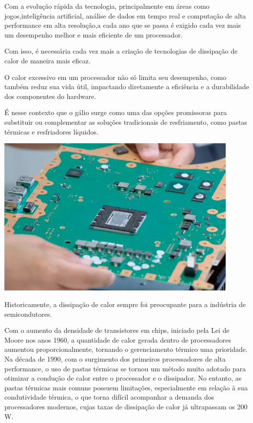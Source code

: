 \documentclass[12pt]{article}
\begin{document}
Com a evolução rápida da tecnologia, principalmente em áreas como jogos,inteligência artificial, análise de dados em tempo real e computação de alta performance em alta resolução,a cada ano que se passa é exigido cada vez mais um desempenho melhor e mais eficiente de um processador. 

Com isso, é necessária cada vez mais a criação de tecnologias de dissipação de calor de maneira mais eficaz. 

O calor excessivo em um processador não só limita seu desempenho, como também reduz sua vida útil, impactando diretamente a eficiência e a durabilidade dos componentes do hardware. 

É nesse contexto que o gálio surge como uma das opções promissoras para substituir ou complementar as soluções tradicionais de resfriamento, como pastas térmicas e resfriadores líquidos.
\begin{adjustbox}{center,caption={Placa Mãe do PS5 (Imagem: PlayStation/Reprodução)},nofloat=figure,vspace=\bigskipamount}
    \centering
    \includegraphics[width=12cm]{mobo.png}
\end{adjustbox}
Historicamente, a dissipação de calor sempre foi preocupante para a indústria de semicondutores. 

Com o aumento da densidade de transistores em chips, iniciado pela Lei de Moore nos anos 1960, a quantidade de calor gerada dentro de processadores aumentou proporcionalmente, tornando o gerenciamento térmico uma prioridade. Na década de 1990, com o surgimento dos primeiros processadores de alta performance, o uso de pastas térmicas se tornou um método muito adotado para otimizar a condução de calor entre o processador e o dissipador. 
No entanto, as pastas térmicas mais comuns possuem limitações, especialmente em relação à sua condutividade térmica, o que torna difícil acompanhar a demanda dos processadores modernos, cujas taxas de dissipação de calor já ultrapassam os 200 W.
\end{document}
